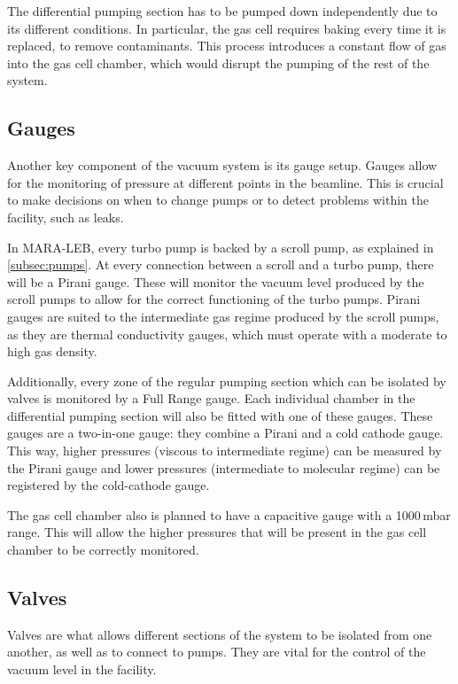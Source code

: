 The differential pumping section has to be pumped down independently due to its different conditions. In particular, the gas cell requires baking every time it is replaced, to remove contaminants. This process introduces a constant flow of gas into the gas cell chamber, which would disrupt the pumping of the rest of the system. 


\subsection{Gauges}
\label{subsec:gauges}

Another key component of the vacuum system is its gauge setup. Gauges allow for the monitoring of pressure at different points in the beamline. This is crucial to make decisions on when to change pumps or to detect problems within the facility, such as leaks. 

In MARA-LEB, every turbo pump is backed by a scroll pump, as explained in \autoref{subsec:pumps}. At every connection between a scroll and a turbo pump, there will be a Pirani gauge. These will monitor the vacuum level produced by the scroll pumps to allow for the correct functioning of the turbo pumps. Pirani gauges are suited to the intermediate gas regime produced by the scroll pumps, as they are thermal conductivity gauges, which must operate with a moderate to high gas density. 

Additionally, every zone of the regular pumping section which can be isolated by valves is monitored by a Full Range gauge. Each individual chamber in the differential pumping section will also be fitted with one of these gauges. These gauges are a two-in-one gauge: they combine a Pirani and a cold cathode gauge. This way, higher pressures (viscous to intermediate regime) can be measured by the Pirani gauge and lower pressures (intermediate to molecular regime) can be registered by the cold-cathode gauge.

The gas cell chamber also is planned to have a capacitive gauge with a 1000\,mbar range. This will allow the higher pressures that will be present in the gas cell chamber to be correctly monitored.

\subsection{Valves}
\label{subsec:valves}

Valves are what allows different sections of the system to be isolated from one another, as well as to connect to pumps. They are vital for the control of the vacuum level in the facility.

